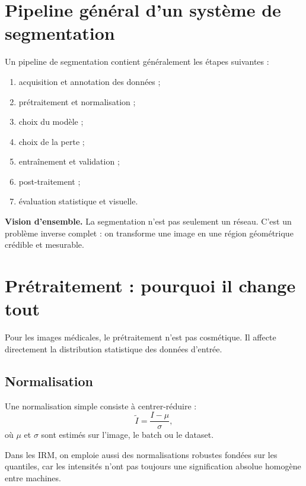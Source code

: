 \documentclass[11pt]{article}
\begin{document}

\tableofcontents
\newpage

\section{Pipeline général d'un système de segmentation}
Un pipeline de segmentation contient généralement les étapes suivantes :
\begin{enumerate}[label=\arabic*)]
  \item acquisition et annotation des données ;
  \item prétraitement et normalisation ;
  \item choix du modèle ;
  \item choix de la perte ;
  \item entraînement et validation ;
  \item post-traitement ;
  \item évaluation statistique et visuelle.
\end{enumerate}

\begin{ideaBox}
\textbf{Vision d'ensemble.} La segmentation n'est pas seulement un réseau. C'est un problème inverse complet : on transforme une image en une région géométrique crédible et mesurable.
\end{ideaBox}

\section{Prétraitement : pourquoi il change tout}
Pour les images médicales, le prétraitement n'est pas cosmétique. Il affecte directement la distribution statistique des données d'entrée.

\subsection{Normalisation}
Une normalisation simple consiste à centrer-réduire :
\[
\widetilde I = \frac{I-\mu}{\sigma},
\]
où $\mu$ et $\sigma$ sont estimés sur l'image, le batch ou le dataset.

Dans les IRM, on emploie aussi des normalisations robustes fondées sur les quantiles, car les intensités n'ont pas toujours une signification absolue homogène entre machines.
\end{document}

